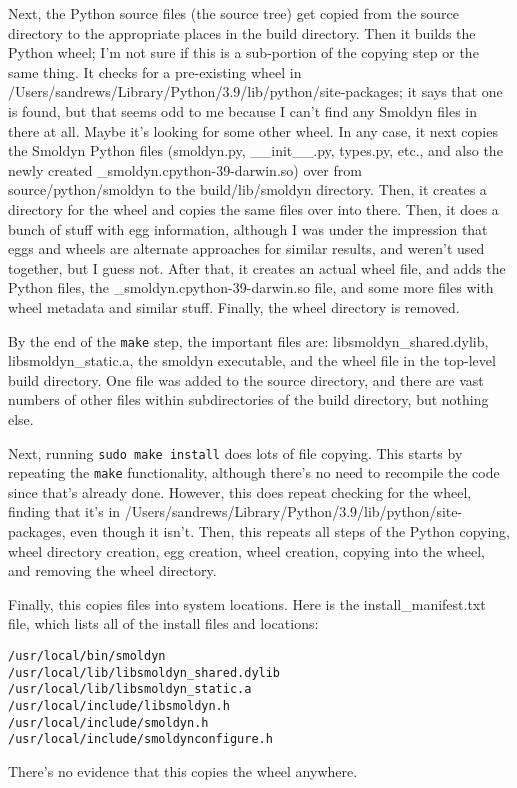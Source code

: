 \documentclass {scrbook}
\newcommand {\ttt} {\texttt}
\begin{document}
Next, the Python source files (the source tree) get copied from the source directory to the appropriate places in the build directory. Then it builds the Python wheel; I'm not sure if this is a sub-portion of the copying step or the same thing. It checks for a pre-existing wheel in /Users/sandrews/Library/Python/3.9/lib/python/site-packages; it says that one is found, but that seems odd to me because I can't find any Smoldyn files in there at all. Maybe it's looking for some other wheel. In any case, it next copies the Smoldyn Python files (smoldyn.py, \_\_init\_\_.py, types.py, etc., and also the newly created \_smoldyn.cpython-39-darwin.so) over from source/python/smoldyn to the build/lib/smoldyn directory. Then, it creates a directory for the wheel and copies the same files over into there. Then, it does a bunch of stuff with egg information, although I was under the impression that eggs and wheels are alternate approaches for similar results, and weren't used together, but I guess not. After that, it creates an actual wheel file, and adds the Python files, the \_smoldyn.cpython-39-darwin.so file, and some more files with wheel metadata and similar stuff. Finally, the wheel directory is removed.

By the end of the \ttt{make} step, the important files are: libsmoldyn\_shared.dylib, libsmoldyn\_static.a, the smoldyn executable, and the wheel file in the top-level build directory. One file was added to the source directory, and there are vast numbers of other files within subdirectories of the build directory, but nothing else.

Next, running \ttt{sudo make install} does lots of file copying. This starts by repeating the \ttt{make} functionality, although there's no need to recompile the code since that's already done. However, this does repeat checking for the wheel, finding that it's in /Users/sandrews/Library/Python/3.9/lib/python/site-packages, even though it isn't. Then, this repeats all steps of the Python copying, wheel directory creation, egg creation, wheel creation, copying into the wheel, and removing the wheel directory.

Finally, this copies files into system locations. Here is the install\_manifest.txt file, which lists all of the install files and locations:
\begin{verbatim}
/usr/local/bin/smoldyn
/usr/local/lib/libsmoldyn_shared.dylib
/usr/local/lib/libsmoldyn_static.a
/usr/local/include/libsmoldyn.h
/usr/local/include/smoldyn.h
/usr/local/include/smoldynconfigure.h
\end{verbatim}
There's no evidence that this copies the wheel anywhere.
\end{document}
